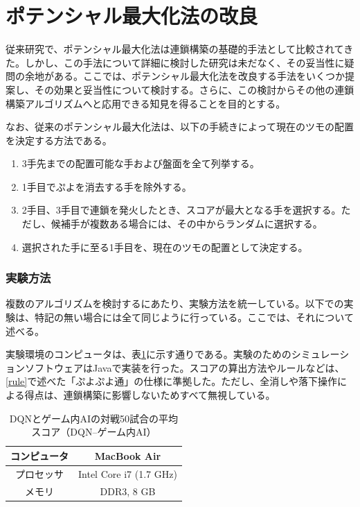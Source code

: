 \documentclass[12pt]{jarticle}
\begin{document}
\part{ポテンシャル最大化法の改良} \setcounter{section}{0}
従来研究で、ポテンシャル最大化法は連鎖構築の基礎的手法として比較されてきた。しかし、この手法について詳細に検討した研究は未だなく、その妥当性に疑問の余地がある。ここでは、ポテンシャル最大化法を改良する手法をいくつか提案し、その効果と妥当性について検討する。さらに、この検討からその他の連鎖構築アルゴリズムへと応用できる知見を得ることを目的とする。

なお、従来のポテンシャル最大化法は、以下の手続きによって現在のツモの配置を決定する方法である。
\begin{enumerate}
\item 3手先までの配置可能な手および盤面を全て列挙する。
\item 1手目でぷよを消去する手を除外する。
\item 2手目、3手目で連鎖を発火したとき、スコアが最大となる手を選択する。ただし、候補手が複数ある場合には、その中からランダムに選択する。
\item 選択された手に至る1手目を、現在のツモの配置として決定する。
\end{enumerate}

\section{実験方法}
複数のアルゴリズムを検討するにあたり、実験方法を統一している。以下での実験は、特記の無い場合には全て同じように行っている。ここでは、それについて述べる。

実験環境のコンピュータは、表\ref{tab:spec}に示す通りである。実験のためのシミュレーションソフトウェアはJavaで実装を行った。スコアの算出方法やルールなどは、\ref{rule}で述べた「ぷよぷよ通」の仕様に準拠した。ただし、全消しや落下操作による得点は、連鎖構築に影響しないためすべて無視している。

\begin{table}[htb]
\begin{center}
\caption{DQNとゲーム内AIの対戦50試合の平均スコア（DQN--ゲーム内AI）} \label{tab:spec}
\begin{tabular}{|c|c|} \hline
コンピュータ & MacBook Air\\ \hline
プロセッサ & Intel Core i7 (1.7 GHz)\\ \hline
メモリ & DDR3, 8 GB\\ \hline
\end{tabular}
\end{center}
\end{table}
\end{document}
